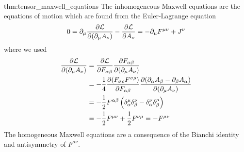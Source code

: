 \begin{delayedproof}{thm:tensor_maxwell_equations}
	The inhomogeneous Maxwell equations are the equations of motion which are found from the Euler-Lagrange equation
	\begin{equation*}
		0
		=
		\partial_\mu
		\pdv{\mathcal{L}}{(\partial_\mu A_\nu)}
		-
		\pdv{\mathcal{L}}{A_\nu}
		=
		-
		\partial_\mu
		F^{\mu\nu}
		+
		J^\nu
	\end{equation*}
	where we used
	\begin{equation*}
		\begin{split}
			\pdv{\mathcal{L}}{(\partial_\mu A_\nu)}
			&=
			\pdv{\mathcal{L}}{F_{\alpha\beta}}
			\pdv{F_{\alpha\beta}}{(\partial_\mu A_\nu)}
			\\
			&=
			-
			\frac{1}{4}
			\pdv{(F_{\sigma\rho}F^{\sigma\rho})}{F_{\alpha\beta}}
			\pdv{(\partial_\alpha A_\beta-\partial_\beta A_\alpha)}{(\partial_\mu A_\nu)}
			\\
			&=
			-
			\frac{1}{2}
			F^{\alpha\beta}
			\left(
				\delta_\alpha^\mu
				\delta_\beta^\nu
				-
				\delta_\alpha^\nu
				\delta_\beta^\mu
			\right)
			\\
			&=
			-
			\frac{1}{2}
			F^{\mu\nu}
			+
			\frac{1}{2}
			F^{\nu\mu}
			=
			-
			F^{\mu\nu}			
		\end{split}
	\end{equation*}
	The homogeneous Maxwell equations are a consequence of the Bianchi identity and antisymmetry of $F^{\mu\nu}$.
\end{delayedproof}
